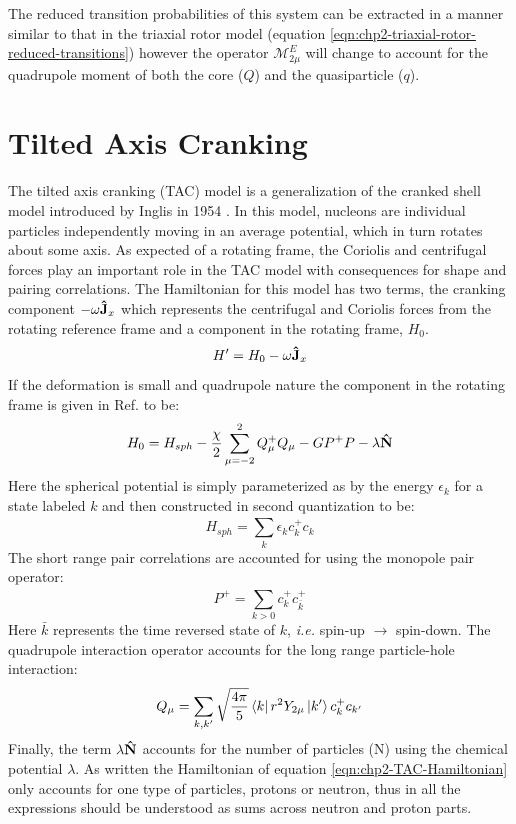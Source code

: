 The reduced transition probabilities of this system can be extracted in a manner similar to that in the triaxial rotor model (equation \ref{eqn:chp2-triaxial-rotor-reduced-transitions}) however the operator $\mathcal{M}^E_{2\mu}$ will change to account for the quadrupole moment of both the core ($Q$) and the quasiparticle ($q$).

\section{Tilted Axis Cranking}
\label{sec:models-tac}
The tilted axis cranking (TAC) model \cite{frauendorfTAC} is a generalization of the cranked shell model introduced by Inglis in 1954 \cite{crankedShellModel}. In this model, nucleons are individual particles independently moving in an average potential, which in turn rotates about some axis. As expected of a rotating frame, the Coriolis and centrifugal forces play an important role in the TAC model with consequences for shape and pairing correlations. The Hamiltonian for this model has two terms, the cranking component $-\omega\boldsymbol{\hat{\textbf{J}}}_x$ which represents the centrifugal and Coriolis forces from the rotating reference frame and a component in the rotating frame, $H_0$.
\begin{equation}
\label{eqn:chp2-TAC-Hamiltonian}
H'=H_0-\omega\boldsymbol{\hat{\textbf{J}}}_x
\end{equation}
If the deformation is small and quadrupole nature the component in the rotating frame is given in Ref. \cite{frauendorfTAC} to be:
\begin{equation}
\label{eqn:chp2-TAC-invar-Hamiltonian}
H_0=H_{sph}-\frac{\chi}{2}\sum\limits_{\mu=-2}^{2}Q_{\mu}^+Q_{\mu} - GP^+P-\lambda\boldsymbol{\hat{\textbf{N}}}
\end{equation}
Here the spherical potential is simply parameterized as by the energy $\epsilon_k$ for a state labeled $k$ and then constructed in second quantization to be:
\begin{equation}
\label{eqn:chp2-TAC-spherical}
H_{sph}=\sum\limits_{k}^{}\epsilon_kc^+_kc_k
\end{equation}
The short range pair correlations are accounted for using the monopole pair operator:
\begin{equation}
\label{eqn:chp2-TAC-pairing}
P^+=\sum\limits_{k>0}^{}c^+_kc^+_{\bar{k}}
\end{equation}
Here $\bar{k}$ represents the time reversed state of $k$, \emph{i.e.} spin-up $\rightarrow$ spin-down. The quadrupole interaction operator accounts for the long range particle-hole interaction:
\begin{equation}
\label{eqn:chp2-TAC-quad}
Q_{\mu}=\sum\limits_{k,k'}^{}\sqrt{\frac{4\pi}{5}}\Bra{k}r^2Y_{2\mu}\Ket{k'}c^+_kc_{k'}
\end{equation}
Finally, the term $\lambda\boldsymbol{\hat{\textbf{N}}}$ accounts for the number of particles (N) using the chemical potential $\lambda$. As written the Hamiltonian of equation \ref{eqn:chp2-TAC-Hamiltonian} only accounts for one type of particles, protons or neutron, thus in all the expressions should be understood as sums across neutron and proton parts.

